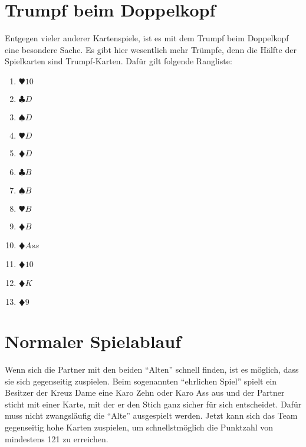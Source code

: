\documentclass[a4paper,11pt]{article}
\begin{document}
\section{Trumpf beim Doppelkopf}
Entgegen vieler anderer Kartenspiele, ist es mit dem Trumpf beim Doppelkopf eine besondere Sache. Es gibt hier wesentlich mehr Trümpfe, denn die Hälfte der Spielkarten sind Trumpf-Karten. Dafür gilt folgende Rangliste:
\begin{enumerate}
\item $\varheart 10$
\item $\clubsuit D$
\item $\spadesuit D$
\item $\varheart D$
\item $\vardiamond D$
\item $\clubsuit B$
\item $\spadesuit B$
\item $\varheart B$
\item $\vardiamond B$ 
\item $\vardiamond Ass$
\item $\vardiamond 10$
\item $\vardiamond K$
\item $\vardiamond 9$
\end{enumerate}

\section{Normaler Spielablauf}
Wenn sich die Partner mit den beiden “Alten” schnell finden, ist es möglich, dass sie sich gegenseitig zuspielen. Beim sogenannten “ehrlichen Spiel” spielt ein Besitzer der Kreuz Dame eine Karo Zehn oder Karo Ass aus und der Partner sticht mit einer Karte, mit der er den Stich ganz sicher für sich entscheidet. Dafür muss nicht zwangsläufig die “Alte” ausgespielt werden. Jetzt kann sich das Team gegenseitig hohe Karten zuspielen, um schnellstmöglich die Punktzahl von mindestens 121 zu erreichen.
\end{document}
